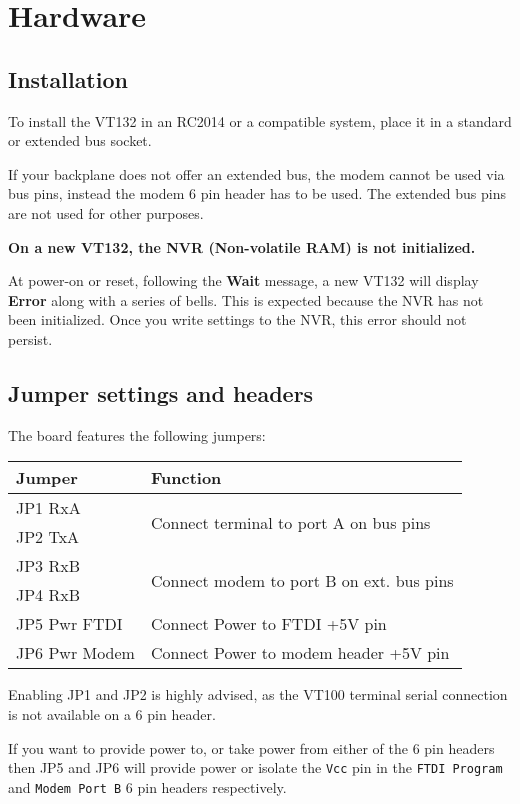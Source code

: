 \chapter{Hardware}

\section{Installation}

To install the VT132 in an RC2014 or a compatible system, place it in a standard or extended bus socket.

If your backplane does not offer an extended bus, the modem cannot be used via bus pins, instead the modem 6 pin header has to be used.
The extended bus pins are not used for other purposes.

\textbf{On a new VT132, the NVR (Non-volatile RAM) is not initialized.}

At power-on or reset, following the \textbf{Wait} message, a new VT132 will display \textbf{Error} along with a series of bells.
This is expected because the NVR has not been initialized.
Once you write settings to the NVR, this error should not persist.

\section{Jumper settings and headers}
\label{jumperheaders}

The board features the following jumpers:

\begin{tabular}{p{7em} | p{}}
\hline
\textbf{Jumper} & \textbf{Function} \\
\hline
JP1 RxA & \multirow{2}{*}{Connect terminal to port A on bus pins} \\
JP2 TxA \\
\hline
JP3 RxB & \multirow{2}{*}{Connect modem to port B on ext. bus pins} \\
JP4 RxB \\
\hline
JP5 Pwr FTDI & Connect Power to FTDI +5V pin \\
\hline
JP6 Pwr Modem & Connect Power to modem header +5V pin \\
\hline
\end{tabular}

Enabling JP1 and JP2 is highly advised, as the VT100 terminal serial connection is not available on a 6 pin header.

If you want to provide power to, or take power from either of the 6 pin headers then JP5 and JP6 will provide power
or isolate the \texttt{Vcc} pin in the \texttt{FTDI Program} and \texttt{Modem Port B} 6 pin headers respectively.

